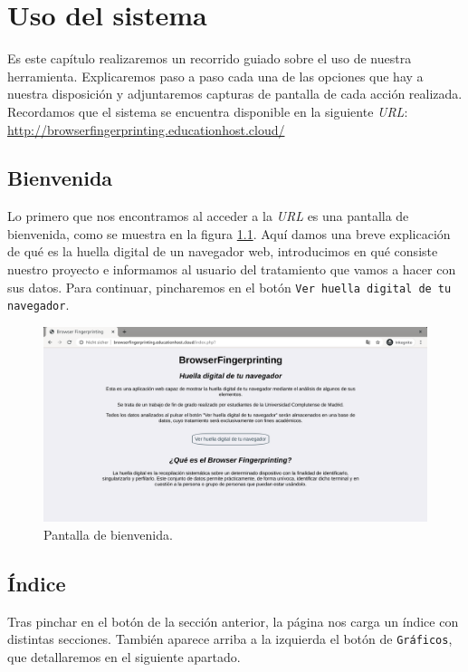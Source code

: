 \chapter{Uso del sistema}
\label{ch:usodelsistema}
Es este capítulo realizaremos un recorrido guiado sobre el uso de nuestra herramienta. Explicaremos paso a paso cada una de las opciones que hay a nuestra disposición y adjuntaremos capturas de pantalla de cada acción realizada. Recordamos que el sistema se encuentra disponible en la siguiente \textit{URL}: \url{http://browserfingerprinting.educationhost.cloud/}

\section{Bienvenida}

Lo primero que nos encontramos al acceder a la \textit{URL} es una pantalla de bienvenida, como se muestra en la figura \ref{fig:wellcome}. Aquí damos una breve explicación de qué es la huella digital de un navegador web, introducimos en qué consiste nuestro proyecto e informamos al usuario del tratamiento que vamos a hacer con sus datos. Para continuar, pincharemos en el botón \texttt{Ver huella digital de tu navegador}.

\begin{figure}[H]
	\centering
	\includegraphics[width=1\textwidth]{Images/wellcome.png}
	\caption{Pantalla de bienvenida.}
	\label{fig:wellcome}
\end{figure}

\section{Índice}

Tras pinchar en el botón de la sección anterior, la página nos carga un índice con distintas secciones. También aparece arriba a la izquierda el botón de \texttt{Gráficos}, que detallaremos en el siguiente apartado.


